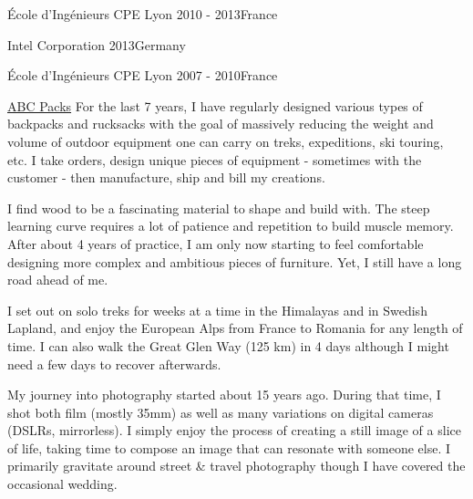 \documentclass[10pt,a4paper]{moderncv}
\begin{document}
\clearpage
    

    {École d'Ingénieurs CPE Lyon}
    {2010 - 2013}{France}

    {Intel Corporation}
    {2013}{Germany}

    {École d'Ingénieurs CPE Lyon}
    {2007 - 2010}{France}



  {\href{https://abcpacks.com}{ABC Packs}}
  {
    For the last 7 years, I have regularly designed various types of backpacks and rucksacks with the goal of massively reducing the weight and volume of outdoor equipment one can carry on treks, expeditions, ski touring, etc. I take orders, design unique pieces of equipment - sometimes with the customer - then manufacture, ship and bill my creations.
  }
  
  {}
  {
    I find wood to be a fascinating material to shape and build with. The steep learning curve requires a lot of patience and repetition to build muscle memory. After about 4 years of practice, I am only now starting to feel comfortable designing more complex and ambitious pieces of furniture. Yet, I still have a long road ahead of me.
  }

  {}
  {
    I set out on solo treks for weeks at a time in the Himalayas and in Swedish Lapland, and enjoy the European Alps from France to Romania for any length of time. I can also walk the Great Glen Way (125 km) in 4 days although I might need a few days to recover afterwards.
  }

  {}
  {
    My journey into photography started about 15 years ago. During that time, I shot both film (mostly 35mm) as well as many variations on digital cameras (DSLRs, mirrorless). I simply enjoy the process of creating a still image of a slice of life, taking time to compose an image that can resonate with someone else. I primarily gravitate around street \& travel photography though I have covered the occasional wedding.
  }


%
\end{document}

